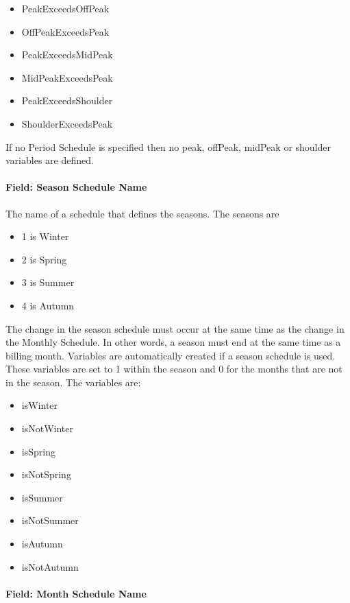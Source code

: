 \begin{itemize}
\item
  PeakExceedsOffPeak
\item
  OffPeakExceedsPeak
\item
  PeakExceedsMidPeak
\item
  MidPeakExceedsPeak
\item
  PeakExceedsShoulder
\item
  ShoulderExceedsPeak
\end{itemize}

If no Period Schedule is specified then no peak, offPeak, midPeak or shoulder variables are defined.

\paragraph{Field: Season Schedule Name}\label{field-season-schedule-name}

The name of a schedule that defines the seasons. The seasons are

\begin{itemize}
\item
  1 is Winter
\item
  2 is Spring
\item
  3 is Summer
\item
  4 is Autumn
\end{itemize}

The change in the season schedule must occur at the same time as the change in the Monthly Schedule. In other words, a season must end at the same time as a billing month. Variables are automatically created if a season schedule is used. These variables are set to 1 within the season and 0 for the months that are not in the season. The variables are:

\begin{itemize}
\item
  isWinter
\item
  isNotWinter
\item
  isSpring
\item
  isNotSpring
\item
  isSummer
\item
  isNotSummer
\item
  isAutumn
\item
  isNotAutumn
\end{itemize}

\paragraph{Field: Month Schedule Name}\label{field-month-schedule-name}

